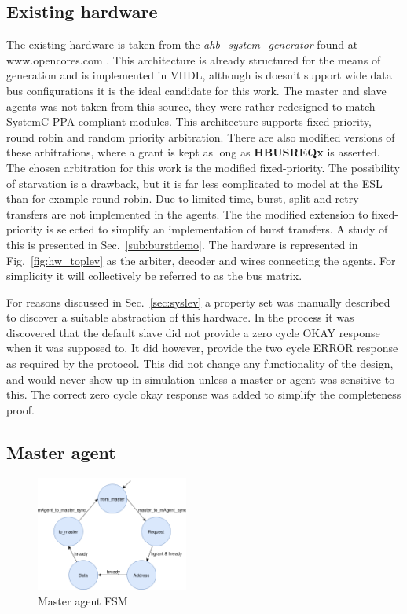 \subsection{Existing hardware}
\label{sub:exist}
The existing hardware is taken from the \textit{ahb\_system\_generator} found at \\
 www.opencores.com \cite{ahbsys}. This architecture is already structured for the means of generation and is implemented in VHDL, although is doesn't support wide data bus configurations it is the ideal candidate for this work. The master and slave agents was not taken from this source, they were rather redesigned to match SystemC-PPA compliant modules. This architecture supports fixed-priority, round robin and random priority arbitration. There are also modified versions of these arbitrations, where a grant is kept as long as \textbf{HBUSREQx} is asserted. The chosen arbitration for this work is the modified fixed-priority. The possibility of starvation is a drawback, but it is far less complicated to model at the ESL than for example round robin. Due to limited time, burst, split and retry transfers are not implemented in the agents. The the modified extension to fixed-priority is selected to simplify an implementation of burst transfers. A study of this is presented in Sec.~\ref{sub:burstdemo}. The hardware is represented in Fig.~\ref{fig:hw_toplev} as the arbiter, decoder and wires connecting the agents. For simplicity it will collectively be referred to as the bus matrix. \par 
For reasons discussed in Sec.~\ref{sec:syslev} a property set was manually described to discover a suitable abstraction of this hardware. In the process it was
discovered that the default slave did not provide a zero cycle OKAY response when it was supposed to. It did however, provide the two cycle ERROR response as 
required by the protocol. This did not change any functionality of the design, and would never show up in simulation unless a master or agent was sensitive to this. The correct zero cycle okay response was added to simplify the completeness proof. 

   
\subsection{Master agent}
\begin{figure}
\includegraphics[width=5cm]{figs/hw/mAgent_FSM.png}
\caption{Master agent FSM}\label{fig:rafsm}
\end{figure}  

